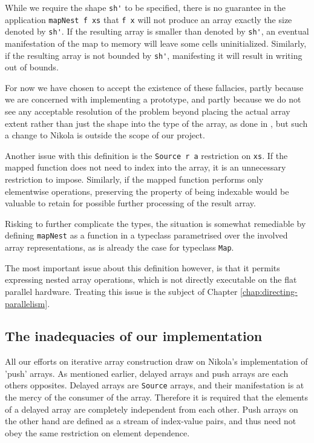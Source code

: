 While we require the shape \lstinline{sh'} to be specified, there is no guarantee
in the application \lstinline{mapNest f xs} that \lstinline{f x} will not produce an
array exactly the size denoted by \lstinline{sh'}. If the resulting array is
smaller than denoted by \lstinline{sh'}, an eventual manifestation of the map to
memory will leave some cells uninitialized. Similarly, if the resulting array
is not bounded by \lstinline{sh'}, manifesting it will result in writing out of
bounds.

For now we have chosen to accept the existence of these fallacies,
partly because we are concerned with implementing a prototype, and
partly because we do not see any acceptable resolution of the problem
beyond placing the actual array extent rather than just the shape into
the type of the array, as done in \cite{thiemannagda}, but such a
change to Nikola is outside the scope of our project.

Another issue with this definition is the \lstinline{Source r a} restriction on
\lstinline{xs}. If the mapped function does not need to index into the array, it
is an unnecessary restriction to impose.  Similarly, if the mapped function
performs only elementwise operations, preserving the property of being
indexable would be valuable to retain for possible further processing of the
result array.

Risking to further complicate the types, the situation is somewhat remediable
by defining \lstinline{mapNest} as a function in a typeclass parametrised over the
involved array representations, as is already the case for typeclass
\lstinline{Map}.

The most important issue about this definition however, is that it permits
expressing nested array operations, which is not directly executable on the flat
parallel hardware. Treating this issue is the subject of Chapter
\ref{chap:directing-parallelism}.

\subsection{The inadequacies of our implementation}

All our efforts on iterative array construction draw on Nikola's implementation
of 'push' arrays. As mentioned earlier, delayed arrays and push arrays are each
others opposites. Delayed arrays are \lstinline{Source} arrays, and their
manifestation is at the mercy of the consumer of the array. Therefore it is
required that the elements of a delayed array are completely independent from
each other. Push arrays on the other hand are defined as a stream of
index-value pairs, and thus need not obey the same restriction on element
dependence.

